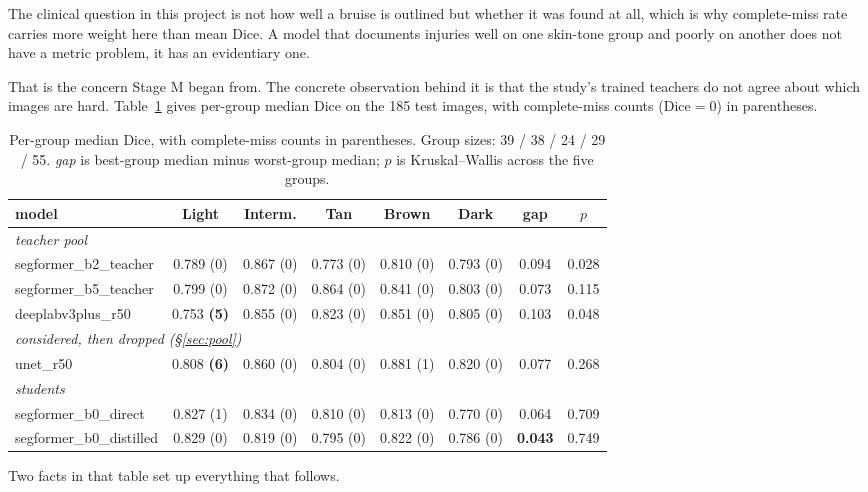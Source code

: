 \documentclass[11pt,a4paper]{article}
\newcommand{\bad}[1]{\textcolor{warn}{\textbf{#1}}}
\newcommand{\good}[1]{\textcolor{ok}{\textbf{#1}}}
\begin{document}
The clinical question in this project is not how well a bruise is outlined but
whether it was found at all, which is why complete-miss rate carries more weight
here than mean Dice. A model that documents injuries well on one skin-tone group
and poorly on another does not have a metric problem, it has an evidentiary one.

That is the concern Stage M began from. The concrete observation behind it is
that the study's trained teachers do not agree about which images are hard.
Table~\ref{tab:pergroup} gives per-group median Dice on the 185 test images,
with complete-miss counts ($\mathrm{Dice}=0$) in parentheses.

\begin{table}[h]
\centering
\small
\caption{Per-group median Dice, with complete-miss counts in parentheses.
Group sizes: 39 / 38 / 24 / 29 / 55. \emph{gap} is best-group median minus
worst-group median; $p$ is Kruskal--Wallis across the five groups.}
\label{tab:pergroup}
\begin{tabular}{lccccccc}
\toprule
model & Light & Interm. & Tan & Brown & Dark & gap & $p$ \\
\midrule
\multicolumn{8}{l}{\emph{teacher pool}}\\
segformer\_b2\_teacher & 0.789 (0) & 0.867 (0) & 0.773 (0) & 0.810 (0) & 0.793 (0) & 0.094 & 0.028 \\
segformer\_b5\_teacher & 0.799 (0) & 0.872 (0) & 0.864 (0) & 0.841 (0) & 0.803 (0) & 0.073 & 0.115 \\
deeplabv3plus\_r50     & 0.753 \bad{(5)} & 0.855 (0) & 0.823 (0) & 0.851 (0) & 0.805 (0) & 0.103 & 0.048 \\
\midrule
\multicolumn{8}{l}{\emph{considered, then dropped (\S\ref{sec:pool})}}\\
unet\_r50              & 0.808 \bad{(6)} & 0.860 (0) & 0.804 (0) & 0.881 (1) & 0.820 (0) & 0.077 & 0.268 \\
\midrule
\multicolumn{8}{l}{\emph{students}}\\
segformer\_b0\_direct    & 0.827 (1) & 0.834 (0) & 0.810 (0) & 0.813 (0) & 0.770 (0) & 0.064 & 0.709 \\
segformer\_b0\_distilled & 0.829 (0) & 0.819 (0) & 0.795 (0) & 0.822 (0) & 0.786 (0) & \good{0.043} & 0.749 \\
\bottomrule
\end{tabular}
\end{table}

Two facts in that table set up everything that follows.
\end{document}

